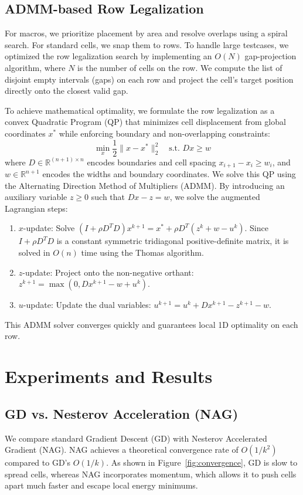 \documentclass[10pt, twocolumn]{article}
\begin{document}
\subsection{ADMM-based Row Legalization}
For macros, we prioritize placement by area and resolve overlaps using a spiral search. For standard cells, we snap them to rows. To handle large testcases, we optimized the row legalization search by implementing an $O(N)$ gap-projection algorithm, where $N$ is the number of cells on the row. We compute the list of disjoint empty intervals (gaps) on each row and project the cell's target position directly onto the closest valid gap.

To achieve mathematical optimality, we formulate the row legalization as a convex Quadratic Program (QP) that minimizes cell displacement from global coordinates $x^*$ while enforcing boundary and non-overlapping constraints:
\begin{equation}
\min_{x} \frac{1}{2} \|x - x^*\|_2^2 \quad \text{s.t. } D x \ge w
\end{equation}
where $D \in \mathbb{R}^{(n+1) \times n}$ encodes boundaries and cell spacing $x_{i+1} - x_i \ge w_i$, and $w \in \mathbb{R}^{n+1}$ encodes the widths and boundary coordinates. We solve this QP using the Alternating Direction Method of Multipliers (ADMM). By introducing an auxiliary variable $z \ge 0$ such that $D x - z = w$, we solve the augmented Lagrangian steps:
\begin{enumerate}
\item $x$-update: Solve $(I + \rho D^T D) x^{k+1} = x^* + \rho D^T(z^k + w - u^k)$. Since $I + \rho D^T D$ is a constant symmetric tridiagonal positive-definite matrix, it is solved in $O(n)$ time using the Thomas algorithm.
\item $z$-update: Project onto the non-negative orthant: $z^{k+1} = \max(0, D x^{k+1} - w + u^k)$.
\item $u$-update: Update the dual variables: $u^{k+1} = u^k + D x^{k+1} - z^{k+1} - w$.
\end{enumerate}
This ADMM solver converges quickly and guarantees local 1D optimality on each row.

\section{Experiments and Results}

\subsection{GD vs. Nesterov Acceleration (NAG)}
We compare standard Gradient Descent (GD) with Nesterov Accelerated Gradient (NAG). NAG achieves a theoretical convergence rate of $O(1/k^2)$ compared to GD's $O(1/k)$. As shown in Figure~\ref{fig:convergence}, GD is slow to spread cells, whereas NAG incorporates momentum, which allows it to push cells apart much faster and escape local energy minimums.
\end{document}
